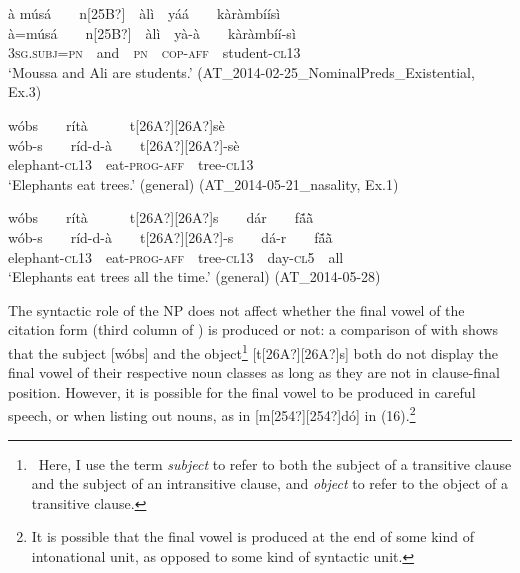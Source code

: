 \documentclass[output=paper]{langsci/langscibook}
\begin{document}
\ea\label{ex:teo:13}
à músá\ \ \ \ n[25B?]\ \ àlì\ \ yá\'{a}\ \ \ \ kàràmb\'{i}\'{i}sì\\
\gll à=músá\ \ \ \ n[25B?]\ \ àlì\ \ y\`{a}-\`{a}\ \ \ \ kàràmb\'{i}\'{i}-sì\\
\textsc{3sg.subj=pn}\ \ and\ \ \textsc{pn\ \ cop-aff}\ \ student\nobreakdash-\textsc{cl13}\\
\glt ‘Moussa and Ali are students.’ (AT\_2014-02-25\_NominalPreds\_Existential, Ex.3)
\z

\ea\label{ex:teo:14}
\label{bkm:Ref264213677}\label{bkm:Ref432672515}w\'{o}bs\ \ \ \ rítà\ \ \ \ \ \ t[26A?][26A?]sè\\
\gll w\'{o}b\nobreakdash-s\ \ \ \ ríd-d-à\ \ \ \ t[26A?][26A?]\nobreakdash-sè\\
elephant\nobreakdash-\textsc{cl13\ \ }eat\nobreakdash-\textsc{prog-aff}\ \ tree\nobreakdash-\textsc{cl13}\\
\glt ‘Elephants eat trees.’ (general) (AT\_2014-05-21\_nasality, Ex.1)
\z

\ea\label{ex:teo:14}
\label{bkm:Ref264213699}\label{bkm:Ref432672521}w\'{o}bs\ \ \ \ rítà\ \ \ \ \ \ t[26A?][26A?]s\ \ \ \ d\'{a}r\ \ \ \ f\'{ã}\`{ã}\\
\gll w\'{o}b\nobreakdash-s\ \ \ \ ríd-d-à\ \ \ \ t[26A?][26A?]\nobreakdash-s\ \ \ \ d\'{a}\nobreakdash-r\ \ \ \ f\'{ã}\`{ã}\\
elephant\nobreakdash-\textsc{cl13\ \ }eat\nobreakdash-\textsc{prog-aff}\ \ tree\nobreakdash-\textsc{cl13\ \ }day-\textsc{cl5}\ \ all\\
\glt ‘Elephants eat trees all the time.’ (general) (AT\_2014-05-28)
\z

The syntactic role of the NP does not affect whether the final vowel of the citation form (third column of ) is produced or not: a comparison of  with  shows that the subject [wóbs]\textit{ }and the object\footnote{\ Here, I use the term \textit{subject} to refer to both the subject of a transitive clause and the subject of an intransitive clause, and \textit{object} to refer to the object of a transitive clause.} [t[26A?][26A?]s] both do not display the final vowel of their respective noun classes as long as they are not in clause-final position. However, it is possible for the final vowel to be produced in careful speech, or when listing out nouns, as in [m[254?][254?]dó] in (16).\footnote{It is possible that the final vowel is produced at the end of some kind of intonational unit, as opposed to some kind of syntactic unit.}
\end{document}
